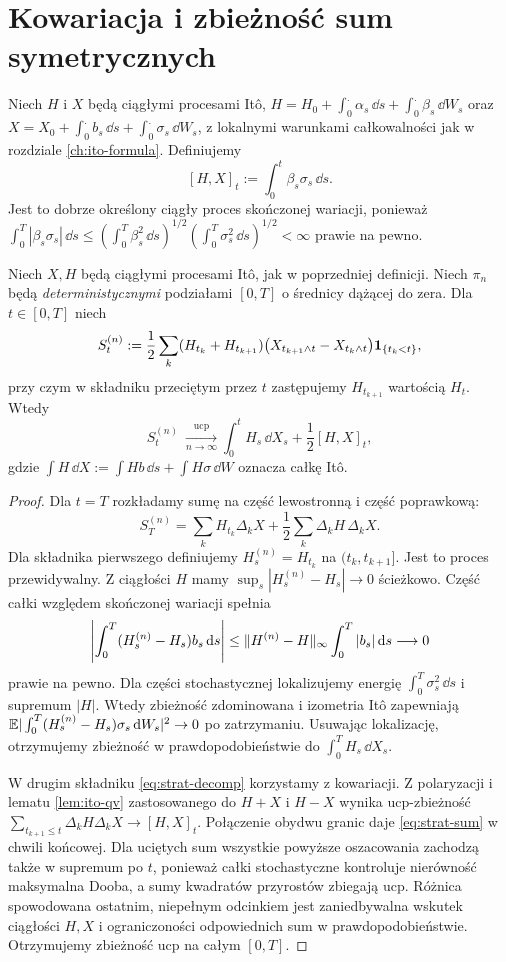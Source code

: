 \section{Kowariacja i zbieżność sum symetrycznych}
\begin{definicja}
Niech $H$ i $X$ będą ciągłymi procesami Itô,
$H=H_0+\int_0^.\alpha_s\,\dd s+
\int_0^.\beta_s\,\dd W_s$ oraz
$X=X_0+\int_0^.b_s\,\dd s+
\int_0^.\sigma_s\,\dd W_s$,
z lokalnymi warunkami całkowalności jak w
rozdziale \ref{ch:ito-formula}. Definiujemy
\[
[H,X]_t:=\int_0^t\beta_s\sigma_s\,\dd s.
\tag{4.1}\label{eq:HX-bracket}
\]
Jest to dobrze określony ciągły proces skończonej
wariacji, ponieważ
$\int_0^T|\beta_s\sigma_s|\,\dd s
\le(\int_0^T\beta_s^2\,\dd s)^{1/2}
(\int_0^T\sigma_s^2\,\dd s)^{1/2}<\infty$
prawie na pewno.
\end{definicja}

\begin{twierdzenie}
\label{th:strat-sums}
Niech $X,H$ będą ciągłymi procesami Itô, jak w
poprzedniej definicji. Niech $\pi_n$ będą
\emph{deterministycznymi} podziałami $[0,T]$
o średnicy dążącej do zera. Dla $t\in[0,T]$
niech
\[
S_t^{(n)}:=\frac12\sum_k
(H_{t_k}+H_{t_{k+1}})
\bigl(X_{t_{k+1}\wedge t}-X_{t_k\wedge t}\bigr)
\mathbf{1}_{\{t_k<t\}},
\]
przy czym w składniku przeciętym przez $t$
zastępujemy $H_{t_{k+1}}$ wartością $H_t$.
Wtedy
\[
S_t^{(n)}\ \xrightarrow[n\to\infty]{\mathrm{ucp}}
\int_0^tH_s\,\dd X_s+\frac12[H,X]_t,
\tag{4.2}\label{eq:strat-sum}
\]
gdzie $\int H\,\dd X:=\int Hb\,\dd s+
\int H\sigma\,\dd W$ oznacza całkę Itô.
\end{twierdzenie}
\begin{proof}
Dla $t=T$ rozkładamy sumę na część lewostronną i
część poprawkową:
\[
S_T^{(n)}=\sum_kH_{t_k}\Delta_kX
+\frac12\sum_k\Delta_kH\,\Delta_kX.
\tag{4.3}\label{eq:strat-decomp}
\]
Dla składnika pierwszego definiujemy
$H_s^{(n)}=H_{t_k}$ na $(t_k,t_{k+1}]$.
Jest to proces przewidywalny. Z ciągłości $H$ mamy
$\sup_s|H_s^{(n)}-H_s|\to0$ ścieżkowo. Część
całki względem skończonej wariacji spełnia
\[
\left|\int_0^T(H_s^{(n)}-H_s)b_s\,\mathrm{d} s\right|
\le\lVert H^{(n)}-H\rVert_\infty\int_0^T|b_s|\,\mathrm{d} s
\longrightarrow0
\]
prawie na pewno. Dla części stochastycznej
lokalizujemy energię $\int_0^T\sigma_s^2\,\dd s$
i supremum $|H|$. Wtedy zbieżność zdominowana
i izometria Itô zapewniają
$\mathbb{E}|\int_0^T(H_s^{(n)}-H_s)\sigma_s\,\mathrm{d} W_s|^2\to0$
po zatrzymaniu. Usuwając lokalizację, otrzymujemy
zbieżność w prawdopodobieństwie do $\int_0^TH_s\,\dd X_s$.

W drugim składniku \eqref{eq:strat-decomp} korzystamy
z kowariacji. Z polaryzacji i lematu
\ref{lem:ito-qv} zastosowanego do $H+X$ i $H-X$
wynika ucp-zbieżność
$\sum_{t_{k+1}\le t}\Delta_kH\Delta_kX\to[H,X]_t$.
Połączenie obydwu granic daje \eqref{eq:strat-sum}
w chwili końcowej. Dla uciętych sum wszystkie powyższe
oszacowania zachodzą także w supremum po $t$, ponieważ
całki stochastyczne kontroluje nierówność maksymalna
Dooba, a sumy kwadratów przyrostów zbiegają ucp.
Różnica spowodowana ostatnim, niepełnym odcinkiem
jest zaniedbywalna wskutek ciągłości $H,X$ i
ograniczoności odpowiednich sum w prawdopodobieństwie.
Otrzymujemy zbieżność ucp na całym $[0,T]$.
\end{proof}

